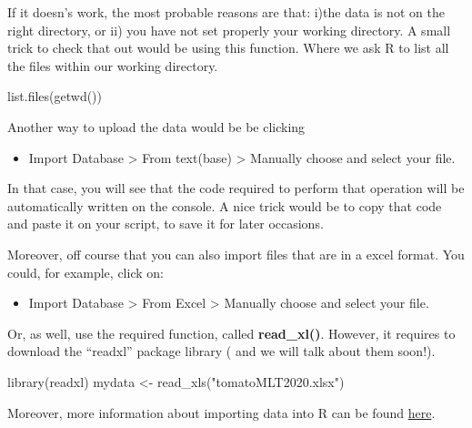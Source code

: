 \documentclass[
]{book}
\newenvironment{Shaded}{\begin{snugshade}}{\end{snugshade}}
\newcommand{\FunctionTok}[1]{\textcolor[rgb]{0.00,0.00,0.00}{#1}}
\newcommand{\NormalTok}[1]{#1}
\newcommand{\OtherTok}[1]{\textcolor[rgb]{0.56,0.35,0.01}{#1}}
\newcommand{\StringTok}[1]{\textcolor[rgb]{0.31,0.60,0.02}{#1}}
\providecommand{\tightlist}{%
  \setlength{\itemsep}{0pt}\setlength{\parskip}{0pt}}
\begin{document}
If it doesn's work, the most probable reasons are that: i)the data is not on the right directory, or ii) you have not set properly your working directory. A small trick to check that out would be using this function. Where we ask R to list all the files within our working directory.

\begin{Shaded}
\begin{Highlighting}[]
\FunctionTok{list.files}\NormalTok{(}\FunctionTok{getwd}\NormalTok{())}
\end{Highlighting}
\end{Shaded}

Another way to upload the data would be be clicking

\begin{itemize}
\tightlist
\item
  Import Database \textgreater{} From text(base) \textgreater{} Manually choose and select your file.
\end{itemize}

In that case, you will see that the code required to perform that operation will be automatically written on the console. A nice trick would be to copy that code and paste it on your script, to save it for later occasions.

Moreover, off course that you can also import files that are in a excel format. You could, for example, click on:

\begin{itemize}
\tightlist
\item
  Import Database \textgreater{} From Excel \textgreater{} Manually choose and select your file.
\end{itemize}

Or, as well, use the required function, called \textbf{read\_xl()}. However, it requires to download the ``readxl'' package library ( and we will talk about them soon!).

\begin{Shaded}
\begin{Highlighting}[]
\FunctionTok{library}\NormalTok{(readxl)}
\NormalTok{mydata }\OtherTok{\textless{}{-}} \FunctionTok{read\_xls}\NormalTok{(}\StringTok{"tomatoMLT2020.xlsx"}\NormalTok{)}
\end{Highlighting}
\end{Shaded}

Moreover, more information about importing data into R can be found \href{http://www.sthda.com/english/wiki/importing-data-into-r}{here}.
\end{document}
